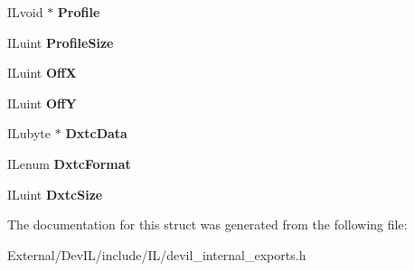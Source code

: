 \begin{DoxyCompactItemize}
\item 
\hypertarget{structILimage_acf542002a824e02234b8fc6f91c16e69}{
ILvoid $\ast$ {\bfseries Profile}}
\label{structILimage_acf542002a824e02234b8fc6f91c16e69}

\item 
\hypertarget{structILimage_a03dcb37bc626f621f4c638fde928bf64}{
ILuint {\bfseries ProfileSize}}
\label{structILimage_a03dcb37bc626f621f4c638fde928bf64}

\item 
\hypertarget{structILimage_ae0438126967c9e3fcdbf916776c7430c}{
ILuint {\bfseries OffX}}
\label{structILimage_ae0438126967c9e3fcdbf916776c7430c}

\item 
\hypertarget{structILimage_a3d0db9b9c3aa7399ff8fe82327e1cc42}{
ILuint {\bfseries OffY}}
\label{structILimage_a3d0db9b9c3aa7399ff8fe82327e1cc42}

\item 
\hypertarget{structILimage_a65df57fee0fb33328ef00fecb7709638}{
ILubyte $\ast$ {\bfseries DxtcData}}
\label{structILimage_a65df57fee0fb33328ef00fecb7709638}

\item 
\hypertarget{structILimage_a41c04c16ff79d67c0c20d726ea411805}{
ILenum {\bfseries DxtcFormat}}
\label{structILimage_a41c04c16ff79d67c0c20d726ea411805}

\item 
\hypertarget{structILimage_a5d423e11ee4e5076d92f6a7e863b2070}{
ILuint {\bfseries DxtcSize}}
\label{structILimage_a5d423e11ee4e5076d92f6a7e863b2070}

\end{DoxyCompactItemize}


The documentation for this struct was generated from the following file:\begin{DoxyCompactItemize}
\item 
External/DevIL/include/IL/devil\_\-internal\_\-exports.h\end{DoxyCompactItemize}
